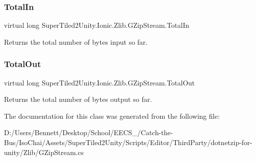 \subsubsection{\texorpdfstring{Total\+In}{TotalIn}}
{\footnotesize\ttfamily virtual long Super\+Tiled2\+Unity.\+Ionic.\+Zlib.\+G\+Zip\+Stream.\+Total\+In\hspace{0.3cm}{\ttfamily [get]}}



Returns the total number of bytes input so far.

\mbox{\label{class_super_tiled2_unity_1_1_ionic_1_1_zlib_1_1_g_zip_stream_aecc3867899f33926a632972aba76519f}} 
\subsubsection{\texorpdfstring{Total\+Out}{TotalOut}}
{\footnotesize\ttfamily virtual long Super\+Tiled2\+Unity.\+Ionic.\+Zlib.\+G\+Zip\+Stream.\+Total\+Out\hspace{0.3cm}{\ttfamily [get]}}



Returns the total number of bytes output so far.



The documentation for this class was generated from the following file\+:\begin{DoxyCompactItemize}
\item 
D\+:/\+Users/\+Bennett/\+Desktop/\+School/\+E\+E\+C\+S\+\_/\+Catch-\/the-\/\+Bus/\+Iso\+Chai/\+Assets/\+Super\+Tiled2\+Unity/\+Scripts/\+Editor/\+Third\+Party/dotnetzip-\/for-\/unity/\+Zlib/G\+Zip\+Stream.\+cs\end{DoxyCompactItemize}
